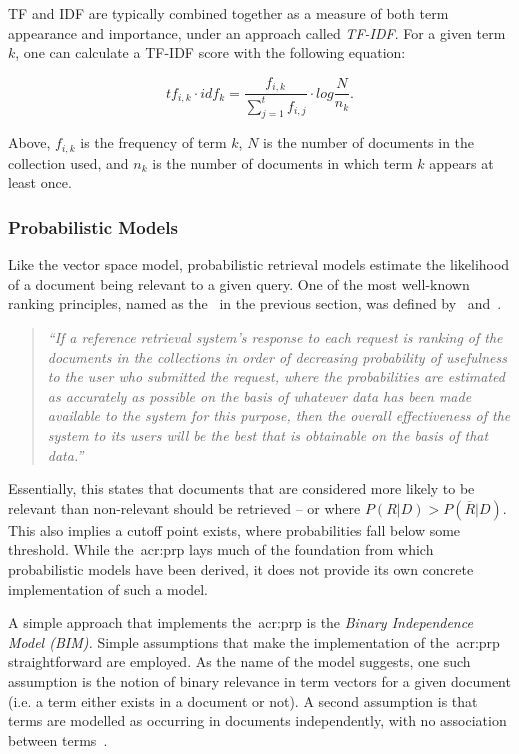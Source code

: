TF and IDF are typically combined together as a measure of both term appearance and importance, under an approach called \emph{TF-IDF}. For a given term $k$, one can calculate a TF-IDF score with the following equation:

\begin{equation}
tf_{i,k} \cdot idf_{k} = \frac{f_{i,k}}{\sum_{j=1}^{t} f_{i,j}} \cdot log \frac{N}{n_k}.
\end{equation}

Above, $f_{i,k}$ is the frequency of term $k$, $N$ is the number of documents in the collection used, and $n_k$ is the number of documents in which term $k$ appears at least once.

\subsubsection{Probabilistic Models}\label{sec:ir_background:basics:models:probabilistic}
Like the vector space model, probabilistic retrieval models estimate the likelihood of a document being relevant to a given query. One of the most well-known ranking principles, named as the~ in the previous section, was defined by~\cite{cooper1971relevance} and~\cite{robertson1977prp}.

\begin{quote}
\emph{``If a reference retrieval system's response to each request is ranking of the documents in the collections in order of decreasing probability of usefulness to the user who submitted the request, where the probabilities are estimated as accurately as possible on the basis of whatever data has been made available to the system for this purpose, then the overall effectiveness of the system to its users will be the best that is obtainable on the basis of that data.''}
\end{quote}

Essentially, this states that documents that are considered more likely to be relevant than non-relevant should be retrieved -- or where $P(R|D) > P(\overline{R}|D)$. This also implies a cutoff point exists, where probabilities fall below some threshold. While the~\gls{acr:prp} lays much of the foundation from which probabilistic models have been derived, it does not provide its own concrete implementation of such a model.

A simple approach that implements the~\gls{acr:prp} is the \emph{Binary Independence Model (BIM).} Simple assumptions that make the implementation of the~\gls{acr:prp} straightforward are employed. As the name of the model suggests, one such assumption is the notion of binary relevance in term vectors for a given document (i.e. a term either exists in a document or not). A second assumption is that terms are modelled as occurring in documents independently, with no association between terms~\citep{manning2008ir}.

